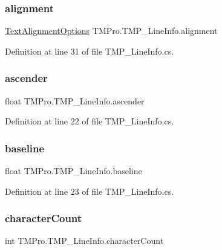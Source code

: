 \subsubsection{\texorpdfstring{alignment}{alignment}}
{\footnotesize\ttfamily \mbox{\hyperlink{namespace_t_m_pro_a1dd743b58b1fd4057c00e4b98ab86301}{Text\+Alignment\+Options}} T\+M\+Pro.\+T\+M\+P\+\_\+\+Line\+Info.\+alignment}



Definition at line 31 of file T\+M\+P\+\_\+\+Line\+Info.\+cs.

\mbox{\label{struct_t_m_pro_1_1_t_m_p___line_info_a6d532182b74c4703af35abd5e7a0699c}} 
\subsubsection{\texorpdfstring{ascender}{ascender}}
{\footnotesize\ttfamily float T\+M\+Pro.\+T\+M\+P\+\_\+\+Line\+Info.\+ascender}



Definition at line 22 of file T\+M\+P\+\_\+\+Line\+Info.\+cs.

\mbox{\label{struct_t_m_pro_1_1_t_m_p___line_info_a1fa19a22a16455f8212e4e7d803acb47}} 
\subsubsection{\texorpdfstring{baseline}{baseline}}
{\footnotesize\ttfamily float T\+M\+Pro.\+T\+M\+P\+\_\+\+Line\+Info.\+baseline}



Definition at line 23 of file T\+M\+P\+\_\+\+Line\+Info.\+cs.

\mbox{\label{struct_t_m_pro_1_1_t_m_p___line_info_a46fd32d5cb7ef22c3271920bbd943db5}} 
\subsubsection{\texorpdfstring{characterCount}{characterCount}}
{\footnotesize\ttfamily int T\+M\+Pro.\+T\+M\+P\+\_\+\+Line\+Info.\+character\+Count}



